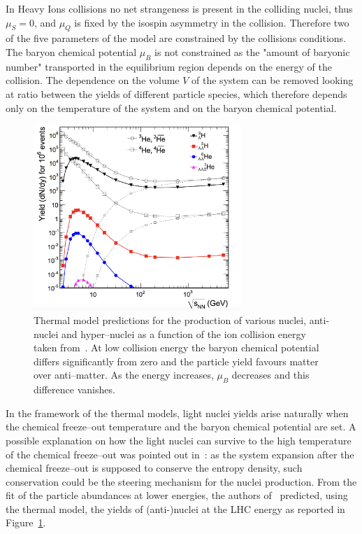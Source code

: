 In Heavy Ions collisions no net strangeness is present in the colliding nuclei, thus 
$\mu_S = 0$, and $\mu_Q$ is fixed by the isospin asymmetry in the collision.
Therefore two of the five parameters of the model are constrained by the collisions
conditions.
The baryon chemical potential $\mu_B$ is not constrained as the "amount of baryonic number"
transported in the equilibrium region depends on the energy of the collision.
The dependence on the volume $V$ of the system can be removed looking at ratio between 
the yields of different particle species, which therefore depends only on the temperature 
of the system and on the baryon chemical potential.
\begin{figure} 
    \centering
    \includegraphics[width=0.7\textwidth]{gfx/yields}
    \caption{Thermal model predictions for the production of various nuclei, anti-nuclei and hyper–nuclei as a function of the ion collision energy taken from~\cite{yields}. At low collision energy the baryon chemical potential differs significantly from zero and the particle yield favours matter over anti–matter. As the energy increases, $\mu_{B}$ decreases and this difference vanishes.
}
\label{fig:aliceyields}
\end{figure}
In the framework of the thermal models, light nuclei yields arise naturally when the chemical 
freeze–out temperature and the baryon chemical potential are set.
A possible explanation on how the light nuclei can survive to the high temperature of the chemical 
freeze–out was pointed out in~\cite{yields}: as the system expansion after the chemical freeze–out
is supposed to conserve the entropy density, such conservation could be the steering mechanism for 
the nuclei production. From the fit of the particle abundances at lower energies, the 
authors of~\cite{yields} predicted, using the thermal model, the yields of (anti-)nuclei 
at the LHC energy as reported in Figure~\ref{fig:aliceyields}.

